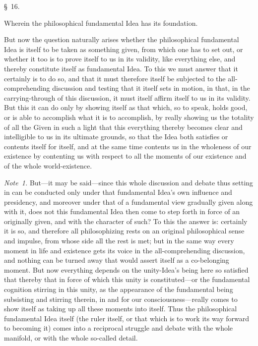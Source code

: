 \documentclass[12pt,a4paper]{book}
\begin{document}
\begin{center}\large\S~16.\end{center}
\begin{center}Wherein the philosophical fundamental Idea has its foundation.\end{center}

But now the question naturally arises whether the philosophical fundamental Idea is
itself to be taken as something given, from which one has to set out, or whether it
too is to prove itself to us in its validity, like everything else, and thereby
constitute itself as fundamental Idea. To this we must answer that it certainly is
to do so, and that it must therefore itself be subjected to the all-comprehending
discussion and testing that it itself sets in motion, in that, in the
carrying-through of this discussion, it must itself affirm itself to us in its
validity. But this it can do only by showing itself as that which, so to speak,
holds good, or is able to accomplish what it is to accomplish, by really showing us
the totality of all the Given in such a light that this everything thereby becomes
clear and intelligible to us in its ultimate grounds, so that the Idea both
satisfies or contents itself for itself, and at the same time contents us in the
wholeness of our existence by contenting us with respect to all the moments of our
existence and of the whole world-existence.

{\small\emph{Note~1.} But---it may be said---since this whole discussion and debate
thus setting in can be conducted only under that fundamental Idea's own influence
and presidency, and moreover under that of a fundamental view gradually given along
with it, does not this fundamental Idea then come to step forth in force of an
originally given, and with the character of such? To this the answer is: certainly
it is so, and therefore all philosophizing rests on an original philosophical sense
and impulse, from whose side all the rest is met; but in the same way every moment
in life and existence gets its voice in the all-comprehending discussion, and
nothing can be turned away that would assert itself as a co-belonging moment. But
now everything depends on the unity-Idea's being here so satisfied that thereby that
in force of which this unity is constituted---or the fundamental cognition stirring
in this unity, as the appearance of the fundamental being subsisting and stirring
therein, in and for our consciousness---really comes to show itself as taking up all
these moments into itself. Thus the philosophical fundamental Idea itself (the ruler
itself, or that which is to work its way forward to becoming it) comes into a
reciprocal struggle and debate with the whole manifold, or with the whole so-called
detail.\par}
\end{document}
